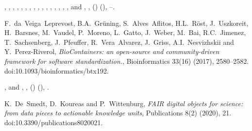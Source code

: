 \documentclass[ds,v1.1.2,openaccess]{iosart2x}%
\begin{document}
\begin{thebibliography}{}
%
\begin{barticle}
,
,
,
,
,
,
,
,
,
,
,
,
,
,
,
,
 and
,
,
()
(),
--.
\end{barticle}
%
\OrigBibText
F.~da~Veiga~Leprevost,
B.A.~Gr\"{u}ning,
S.~Alves~Aflitos,
H.L.~R\"{o}st,
J.~Uszkoreit,
H.~Barsnes,
M.~Vaudel,
P.~Moreno,
L.~Gatto,
J.~Weber,
M.~Bai,
R.C.~Jimenez,
T.~Sachsenberg,
J.~Pfeuffer,
R.~Vera~Alvarez,
J.~Griss,
A.I.~Nesvizhskii and
Y.~Perez-Riverol,
\textit{{BioContainers}: an open-source and community-driven framework for
software standardization.},
Bioinformatics
33(16)
(2017),
2580--2582.
doi:10.1093/bioinformatics/btx192.
\endOrigBibText
{}
\endbibitem

%
\begin{barticle}
,
 and
,
,
()
(),
.
\end{barticle}
%
\OrigBibText
K.~De~Smedt,
D.~Koureas and
P.~Wittenburg,
\textit{{FAIR} digital objects for science: from data pieces to actionable
knowledge units},
Publications
8(2)
(2020),
21.
doi:10.3390/publications8020021.
\endOrigBibText
{}
\endbibitem


\end{thebibliography}
\end{document}
